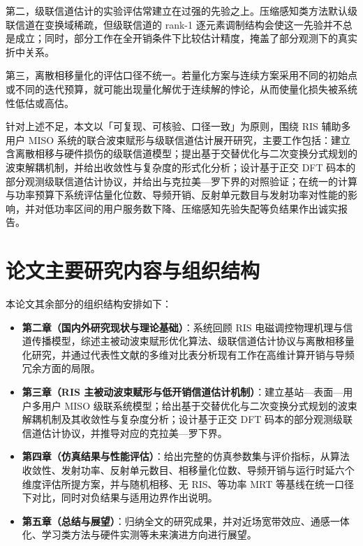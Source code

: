第二，级联信道估计的实验评估常建立在过强的先验之上。压缩感知类方法默认级联信道在变换域稀疏，但级联信道的 rank-1 逐元素调制结构会使这一先验并不总是成立；同时，部分工作在全开销条件下比较估计精度，掩盖了部分观测下的真实折中关系。

第三，离散相移量化的评估口径不统一。若量化方案与连续方案采用不同的初始点或不同的迭代预算，就可能出现量化解优于连续解的悖论，从而使量化损失被系统性低估或高估。

针对上述不足，本文以「可复现、可核验、口径一致」为原则，围绕 RIS 辅助多用户 MISO 系统的联合波束赋形与级联信道估计展开研究，主要工作包括：建立含离散相移与硬件损伤的级联信道模型；提出基于交替优化与二次变换分式规划的波束解耦机制，并给出收敛性与复杂度的形式化分析；设计基于正交 DFT 码本的部分观测级联信道估计协议，并给出与克拉美—罗下界的对照验证；在统一的计算与功率预算下系统评估量化位数、导频开销、反射单元数目与发射功率对性能的影响，并对低功率区间的用户服务数下降、压缩感知先验失配等负结果作出诚实报告。

\section{论文主要研究内容与组织结构}

本论文其余部分的组织结构安排如下：

\begin{itemize}
  \item \textbf{第二章（国内外研究现状与理论基础）}：系统回顾 RIS 电磁调控物理机理与信道传播模型，综述主被动波束赋形优化算法、级联信道估计协议与离散相移量化研究，并通过代表性文献的多维对比表分析现有工作在高维计算开销与导频冗余方面的局限。
  \item \textbf{第三章（RIS 主被动波束赋形与低开销信道估计机制）}：建立基站—表面—用户多用户 MISO 级联系统模型；给出基于交替优化与二次变换分式规划的波束解耦机制及其收敛性与复杂度分析；设计基于正交 DFT 码本的部分观测级联信道估计协议，并推导对应的克拉美—罗下界。
  \item \textbf{第四章（仿真结果与性能评估）}：给出完整的仿真参数集与评价指标，从算法收敛性、发射功率、反射单元数目、相移量化位数、导频开销与运行时延六个维度评估所提方案，并与随机相移、无 RIS、等功率 MRT 等基线在统一口径下对比，同时对负结果与适用边界作出说明。
  \item \textbf{第五章（总结与展望）}：归纳全文的研究成果，并对近场宽带效应、通感一体化、学习类方法与硬件实测等未来演进方向进行展望。
\end{itemize}
